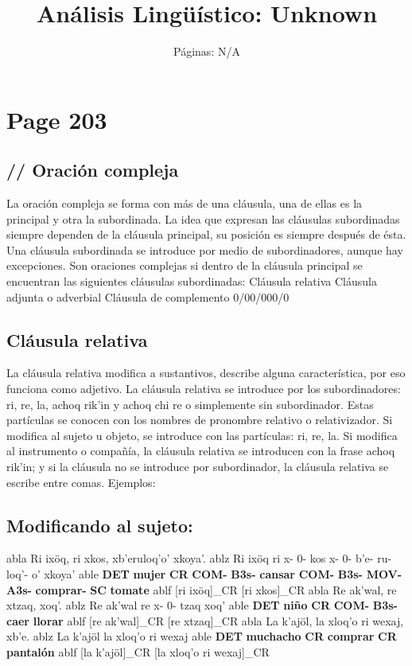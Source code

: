 \documentclass{article}%
\title{Análisis Lingüístico: Unknown}%
\author{Páginas: N/A}%
\begin{document}
%
\normalsize%
\maketitle%
\section{Page 203}%
\label{sec:Page203}%

%
\subsection{// Oración compleja}%
\label{subsec://Oracincompleja}%

%
La oración compleja se forma con más de una cláusula, una de ellas es la principal y %
otra la subordinada. La idea que expresan las cláusulas subordinadas siempre dependen %
de la cláusula principal, su posición es siempre después de ésta. Una cláusula subordinada %
se introduce por medio de subordinadores, aunque hay excepciones. Son oraciones %
complejas si dentro de la cláusula principal se encuentran las siguientes cláusulas %
subordinadas: %
Cláusula relativa %
Cláusula adjunta o adverbial %
Cláusula de complemento %
0/00/000/0 %
\subsection{Cláusula relativa}%
\label{subsec:Clusularelativa}%

%
La cláusula relativa modifica a sustantivos, describe alguna característica, por eso %
funciona como adjetivo. La cláusula relativa se introduce por los subordinadores: ri, %
re, la, achoq rik'in y achoq chi re o simplemente sin subordinador. Estas partículas se %
conocen con los nombres de pronombre relativo o relativizador. Si modifica al sujeto u %
objeto, se introduce con las partículas: ri, re, la. Si modifica al instrumento o compañía, %
la cláusula relativa se introducen con la frase achoq rik'in; y si la cláusula no se %
introduce por subordinador, la cláusula relativa se escribe entre comas. Ejemplos: %
\subsection{Modificando al sujeto:}%
\label{subsec:Modificandoalsujeto}%

%
\ex
  	abla Ri ixöq, ri xkos, xb'eruloq'o' xkoya'.
  	ablz Ri ixöq ri x- 0- kos x- 0- b'e- ru- loq'- o' xkoya'
  	able \textbf{DET} \textbf{mujer} \textbf{CR} \textbf{COM-} \textbf{B3s-} \textbf{cansar} \textbf{COM-} \textbf{B3s-} \textbf{MOV-} \textbf{A3s-} \textbf{comprar-} \textbf{SC} \textbf{tomate}
  	ablf [ri ixöq]_{CR} [ri xkos]_{CR}
\ex
  	abla Re ak'wal, re xtzaq, xoq'.
  	ablz Re ak'wal re x- 0- tzaq xoq'
  	able \textbf{DET} \textbf{niño} \textbf{CR} \textbf{COM-} \textbf{B3s-} \textbf{caer} \textbf{llorar}
  	ablf [re ak'wal]_{CR} [re xtzaq]_{CR}
\ex
  	abla La k'ajöl, la xloq'o ri wexaj, xb'e.
  	ablz La k'ajöl la xloq'o ri wexaj
  	able \textbf{DET} \textbf{muchacho} \textbf{CR} \textbf{comprar} \textbf{CR} \textbf{pantalón}
  	ablf [la k'ajöl]_{CR} [la xloq'o ri wexaj]_{CR}
\end{document}
